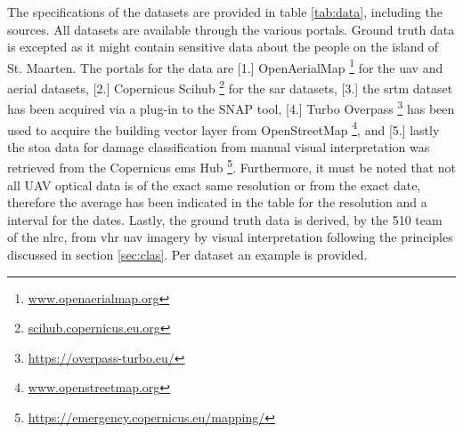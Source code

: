 \noindent The specifications of the datasets are provided in table \ref{tab:data}, including the sources. All datasets are available through the various portals. Ground truth data is excepted as it might contain sensitive data about the people on the island of St. Maarten. The portals for the data are [1.] OpenAerialMap \footnote{\url{www.openaerialmap.org}} for the \ac{uav} and aerial datasets, [2.] Copernicus Scihub \footnote{\url{scihub.copernicus.eu.org}} for the \ac{sar} datasets, [3.] the \ac{srtm} dataset has been acquired via a plug-in to the SNAP tool,  [4.] Turbo Overpass \footnote{\url{https://overpass-turbo.eu/}} has been used to acquire the building vector layer from OpenStreetMap \footnote{\url{www.openstreetmap.org}}, and [5.] lastly the \ac{stoa} data for damage classification from manual visual interpretation was retrieved from the Copernicus \ac{ems} Hub \footnote{\url{https://emergency.copernicus.eu/mapping/}}. Furthermore, it must be noted that not all UAV optical data is of the exact same resolution or from the exact date, therefore the average has been indicated in the table for the resolution and a interval for the dates. Lastly, the ground truth data is derived, by the 510 team of the \ac{nlrc}, from \ac{vhr} \ac{uav} imagery by visual interpretation following the principles discussed in section \ref{sec:clas}. Per dataset an example is provided.\\

